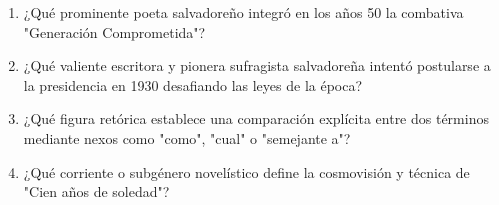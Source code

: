 \documentclass[10pt,a4paper]{article}
\begin{document}
\begin{enumerate}[label=\textbf{\arabic*.}]
\item ¿Qué prominente poeta salvadoreño integró en los años 50 la combativa "Generación Comprometida"?
\begin{enumerate}[label=\textbf{\Alph*)}]
\end{enumerate}
\vspace{0.15cm}
\item ¿Qué valiente escritora y pionera sufragista salvadoreña intentó postularse a la presidencia en 1930 desafiando las leyes de la época?
\begin{enumerate}[label=\textbf{\Alph*)}]
\end{enumerate}
\vspace{0.15cm}
\item ¿Qué figura retórica establece una comparación explícita entre dos términos mediante nexos como "como", "cual" o "semejante a"?
\begin{enumerate}[label=\textbf{\Alph*)}]
\end{enumerate}
\vspace{0.15cm}
\item ¿Qué corriente o subgénero novelístico define la cosmovisión y técnica de "Cien años de soledad"?
\begin{enumerate}[label=\textbf{\Alph*)}]
\end{enumerate}
\end{enumerate}
\end{document}
